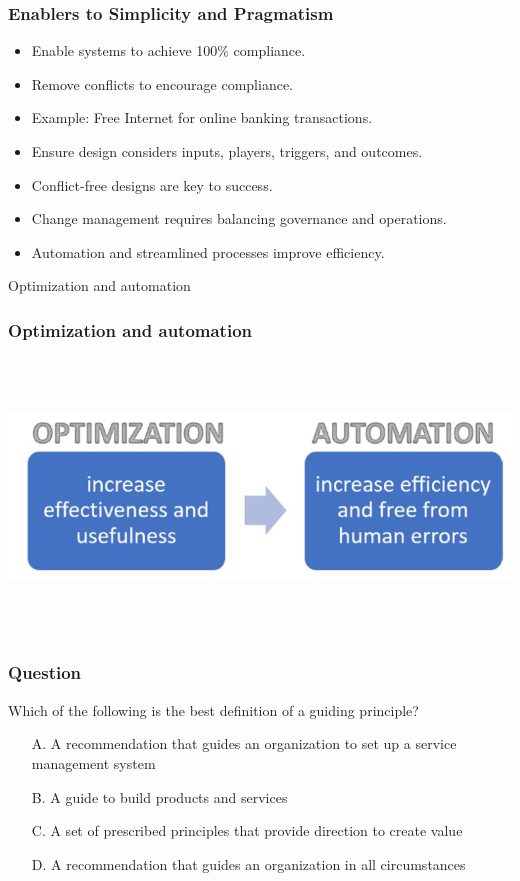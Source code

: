 \documentclass[aspectratio=169, table]{beamer}
\begin{document}
\begin{frame}
\frametitle{Enablers to Simplicity and Pragmatism}

\begin{itemize}
	\item Enable systems to achieve 100\% compliance.
	\item Remove conflicts to encourage compliance.
	\item Example: Free Internet for online banking transactions.
	\item Ensure design considers inputs, players, triggers, and outcomes.
	\item Conflict-free designs are key to success.
	\item Change management requires balancing governance and operations.
	\item Automation and streamlined processes improve efficiency.
\end{itemize}
\end{frame}

\begin{frame}{Optimization and automation} 	 \frametitle{Optimization and automation} \begin{center} 	\includegraphics[width=0.8\linewidth]{images/image-03.png} \end{center} \end{frame}

\begin{frame}
	\frametitle{Question}
	
	Which of the following is the best definition of a guiding principle?
	
	\begin{itemize}
		\item[A.] A recommendation that guides an organization to set up a service management system
		\item[B.] A guide to build products and services
		\item[C.] A set of prescribed principles that provide direction to create value
		\item[D.] A recommendation that guides an organization in all circumstances
	\end{itemize}
	
\end{frame}
\end{document}

